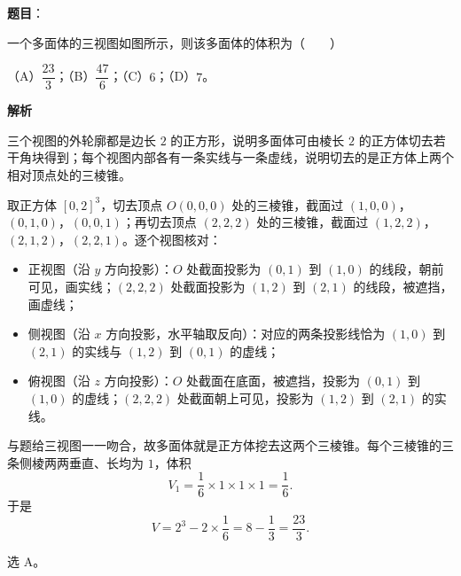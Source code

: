 \begin{answer}

\textbf{题目}：

一个多面体的三视图如图所示，则该多面体的体积为\mbox{（　　）}

（A）$\dfrac{23}3$；（B）$\dfrac{47}6$；（C）$6$；（D）$7$。
\nopagebreak[4]
\begin{center}\end{center}
\nopagebreak[4]
\textbf{解析}

三个视图的外轮廓都是边长 $2$ 的正方形，说明多面体可由棱长 $2$ 的正方体切去若干角块得到；每个视图内部各有一条实线与一条虚线，说明切去的是正方体上两个相对顶点处的三棱锥。

取正方体 $[0,2]^3$，切去顶点 $O(0,0,0)$ 处的三棱锥，截面过 $(1,0,0)$，$(0,1,0)$，$(0,0,1)$；再切去顶点 $(2,2,2)$ 处的三棱锥，截面过 $(1,2,2)$，$(2,1,2)$，$(2,2,1)$。逐个视图核对：

\begin{itemize}
\item 正视图（沿 $y$ 方向投影）：$O$ 处截面投影为 $(0,1)$ 到 $(1,0)$ 的线段，朝前可见，画实线；$(2,2,2)$ 处截面投影为 $(1,2)$ 到 $(2,1)$ 的线段，被遮挡，画虚线；
\item 侧视图（沿 $x$ 方向投影，水平轴取反向）：对应的两条投影线恰为 $(1,0)$ 到 $(2,1)$ 的实线与 $(1,2)$ 到 $(0,1)$ 的虚线；
\item 俯视图（沿 $z$ 方向投影）：$O$ 处截面在底面，被遮挡，投影为 $(0,1)$ 到 $(1,0)$ 的虚线；$(2,2,2)$ 处截面朝上可见，投影为 $(1,2)$ 到 $(2,1)$ 的实线。
\end{itemize}

与题给三视图一一吻合，故多面体就是正方体挖去这两个三棱锥。每个三棱锥的三条侧棱两两垂直、长均为 $1$，体积
\nopagebreak[4]
\[V_1=\frac16\times1\times1\times1=\frac16 .\]
于是
\nopagebreak[4]
\[V=2^3-2\times\frac16=8-\frac13=\frac{23}3 .\]

选 A。


\end{answer}
